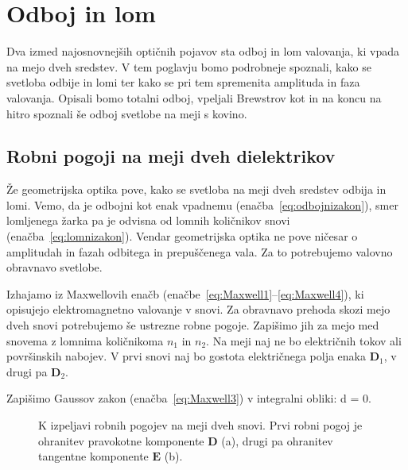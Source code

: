 
\chapter{Odboj in lom}
Dva izmed najosnovnejših optičnih pojavov sta odboj in lom valovanja, ki vpada na mejo
dveh sredstev. V tem poglavju bomo podrobneje spoznali, kako se svetloba odbije in lomi ter
kako se pri tem spremenita amplituda in faza valovanja. Opisali bomo totalni odboj,
vpeljali Brewstrov kot in na koncu na hitro spoznali še odboj svetlobe na meji s kovino.

\section{Robni pogoji na meji dveh dielektrikov}
Že geometrijska optika pove, kako se svetloba na meji dveh sredstev odbija 
in lomi. Vemo, da je odbojni kot enak vpadnemu (enačba~\ref{eq:odbojnizakon}), 
smer lomljenega žarka pa je odvisna od lomnih količnikov snovi (enačba~\ref{eq:lomnizakon}). 
Vendar geometrijska optika ne pove ničesar o amplitudah in fazah odbitega 
in prepuščenega vala. Za to potrebujemo valovno obravnavo svetlobe. 

Izhajamo iz Maxwellovih enačb (enačbe~\ref{eq:Maxwell1}--\ref{eq:Maxwell4}), ki 
opisujejo elektromagnetno valovanje v snovi. Za obravnavo prehoda
skozi mejo dveh snovi potrebujemo še ustrezne robne pogoje. Zapišimo jih
za mejo med snovema z lomnima količnikoma
$n_1$ in $n_2$. Na meji naj ne bo električnih tokov ali površinskih nabojev. 
V prvi snovi naj bo gostota električnega polja enaka $\mathbf{D}_1$, v drugi 
pa $\mathbf{D}_2$.

Zapišimo Gaussov zakon (enačba~\ref{eq:Maxwell3}) v integralni obliki:
\beq
\oint {}\cdot d = 0.
\label{eq:04_01}
\eeq
\begin{figure}[ht]
\centering
\def\svgwidth{120truemm} 

\caption{K izpeljavi robnih pogojev na meji dveh snovi. Prvi robni pogoj je ohranitev
pravokotne komponente $\mathbf{D}$ (a), drugi pa ohranitev tangentne komponente 
$\mathbf{E}$ (b).}
\label{fig:04_RP}
\end{figure}

